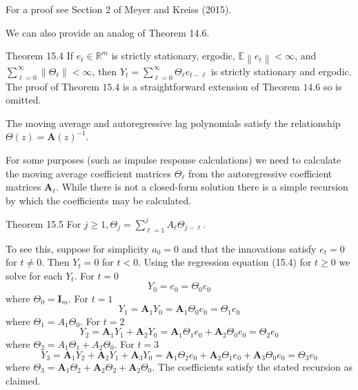 \documentclass[10pt]{article}
\begin{document}
For a proof see Section 2 of Meyer and Kreiss (2015).

We can also provide an analog of Theorem 14.6.

Theorem 15.4 If $e_{t} \in \mathbb{R}^{m}$ is strictly stationary, ergodic, $\mathbb{E}\left\|e_{t}\right\|<\infty$, and $\sum_{\ell=0}^{\infty}\left\|\Theta_{\ell}\right\|<\infty$, then $Y_{t}=\sum_{\ell=0}^{\infty} \Theta_{\ell} e_{t-\ell}$ is strictly stationary and ergodic. The proof of Theorem $15.4$ is a straightforward extension of Theorem $14.6$ so is omitted.

The moving average and autoregressive lag polynomials satisfy the relationship $\Theta(z)=\boldsymbol{A}(z)^{-1}$.

For some purposes (such as impulse response calculations) we need to calculate the moving average coefficient matrices $\Theta_{\ell}$ from the autoregressive coefficient matrices $\boldsymbol{A}_{\ell}$. While there is not a closed-form solution there is a simple recursion by which the coefficients may be calculated.

Theorem 15.5 For $j \geq 1, \Theta_{j}=\sum_{\ell=1}^{j} A_{\ell} \Theta_{j-\ell}$.

To see this, suppose for simplicity $a_{0}=0$ and that the innovations satisfy $e_{t}=0$ for $t \neq 0$. Then $Y_{t}=0$ for $t<0$. Using the regression equation (15.4) for $t \geq 0$ we solve for each $Y_{t}$. For $t=0$
$$
Y_{0}=e_{0}=\Theta_{0} e_{0}
$$
where $\Theta_{0}=\boldsymbol{I}_{m}$. For $t=1$
$$
Y_{1}=\boldsymbol{A}_{1} Y_{0}=\boldsymbol{A}_{1} \Theta_{0} e_{0}=\Theta_{1} e_{0}
$$
where $\Theta_{1}=A_{1} \Theta_{0}$. For $t=2$
$$
Y_{2}=\boldsymbol{A}_{1} Y_{1}+\boldsymbol{A}_{2} Y_{0}=\boldsymbol{A}_{1} \Theta_{1} e_{0}+\boldsymbol{A}_{2} \Theta_{0} e_{0}=\Theta_{2} e_{0}
$$
where $\Theta_{2}=A_{1} \Theta_{1}+A_{2} \Theta_{0}$. For $t=3$
$$
Y_{3}=\boldsymbol{A}_{1} Y_{2}+\boldsymbol{A}_{2} Y_{1}+\boldsymbol{A}_{3} Y_{0}=\boldsymbol{A}_{1} \Theta_{2} e_{0}+\boldsymbol{A}_{2} \Theta_{1} e_{0}+\boldsymbol{A}_{3} \Theta_{0} e_{0}=\Theta_{3} e_{0}
$$
where $\Theta_{3}=\boldsymbol{A}_{1} \Theta_{2}+\boldsymbol{A}_{2} \Theta_{2}+\boldsymbol{A}_{2} \Theta_{0}$. The coefficients satisfy the stated recursion as claimed.
\end{document}

